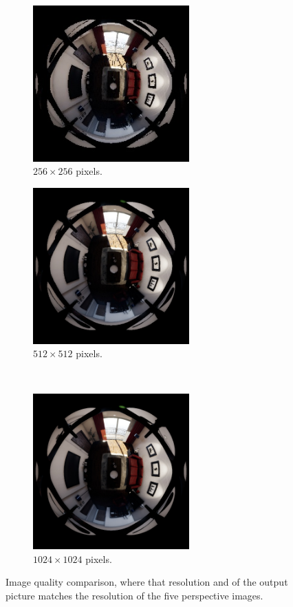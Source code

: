 \begin{figure}[!htb]
    \centering
    \begin{subfigure}{0.45\textwidth}
    \centering
        \includegraphics[height=6cm]{rapport/fig/Results/256to256.jpeg}
        \caption{$256 \times 256$ pixels.}
        \label{fig:res_comp_256_to_256}
    \end{subfigure}
    \begin{subfigure}{0.45\textwidth}
        \centering
        \includegraphics[height=6cm]{rapport/fig/Results/512to512.jpeg}
        \caption{$512 \times 512$ pixels.}
        \label{fig:res_comp_512_512}
    \end{subfigure} \\   
    \begin{subfigure}{0.7\textwidth}
        \centering
        \includegraphics[height=6cm]{rapport/fig/Results/1024to1024.jpeg}
        \caption{$1024 \times 1024$ pixels.}
        \label{fig:res_comp_1024_1024}
    \end{subfigure}
    \centering
    \caption{Image quality comparison, where that resolution and of the output picture matches the resolution of the five perspective images.}
    \label{fig:res_quality_comparison}
\end{figure}

